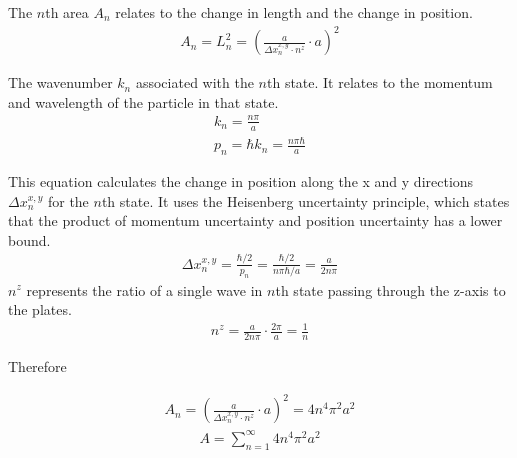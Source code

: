     The $n$th area $A_n$ relates to the change in length and the change in position.
    \begin{align}
        &A_n = L_n^2 = (\frac{a}{\Delta x_n^{x,y} \cdot n^z} \cdot a)^2&
    \end{align}

    The wavenumber $k_n$ associated with the $n$th state. It relates to the momentum and wavelength of the particle in that state.
    \begin{align}
        &k_n = \frac{n \pi}{a}&\\
        &p_n = \hbar k_n = \frac{n \pi \hbar}{a}&
    \end{align}

    This equation calculates the change in position along the x and y directions $\Delta x_n^{x,y}$ for the $n$th state. 
It uses the Heisenberg uncertainty principle, which states that the product of momentum uncertainty and position uncertainty 
has a lower bound.
    \begin{align}
        &\Delta x_n^{x, y} = \frac{\hbar/2}{p_n} = \frac{\hbar/2}{n \pi \hbar/a} = \frac{a}{2 n \pi}&
    \end{align}
$n^z$ represents the ratio of a single wave in $n$th state passing through the z-axis to the plates.
    \begin{align}
        &n^z = \frac{a}{2 n \pi} \cdot \frac{2 \pi}{a} =\frac{1}{n}&
    \end{align}
    
Therefore

    \begin{align}
        A_n = (\frac{a}{\Delta x_n^{x,y} \cdot n^z} \cdot a)^2 = 4 n^4 \pi^2 a^2
    \end{align}
    \begin{align}
        A = \sum_{n=1}^{\infty}4 n^4 \pi^2 a^2
    \end{align}

